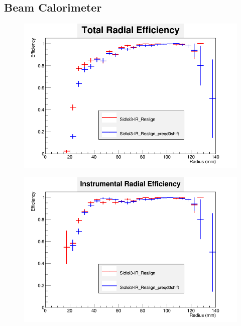 \documentclass{report}
\begin{document}
            \subsection{Beam Calorimeter}
                \begin{figure}[H] 
                    \includegraphics[width=\textwidth]{RadialEfficiencyFP_total}
                    \centering
                    \caption{}
                    \label{fig:lstar_beamcal_total}
                \end{figure}
                \begin{figure}[H]
                    \includegraphics[width=\textwidth]{RadialEfficiencyFP_instrumental}
                    \centering
                    \caption{}
                    \label{fig:lstar_beamcal_inst}
                \end{figure}
\end{document}
